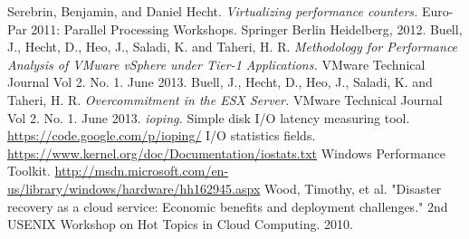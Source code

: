 \begin{thebibliography}{9}
Serebrin, Benjamin, and Daniel Hecht.  \emph{Virtualizing performance counters.}  Euro-Par 2011: Parallel Processing Workshops. Springer Berlin Heidelberg, 2012.
Buell, J., Hecht, D., Heo, J., Saladi, K. and Taheri, H. R.  \emph{Methodology for Performance Analysis of VMware vSphere under Tier-1 Applications.}  VMware Technical Journal Vol 2. No. 1.  June 2013.
Buell, J., Hecht, D., Heo, J., Saladi, K. and Taheri, H. R.  \emph{Overcommitment in the ESX Server.}  VMware Technical Journal Vol 2. No. 1.  June 2013.
\emph{ioping.}  Simple disk I/O latency measuring tool.  \url{https://code.google.com/p/ioping/}
 I/O statistics fields. \url{https://www.kernel.org/doc/Documentation/iostats.txt}
 Windows Performance Toolkit. \url{http://msdn.microsoft.com/en-us/library/windows/hardware/hh162945.aspx}
 Wood, Timothy, et al. "Disaster recovery as a cloud service: Economic benefits and deployment challenges." 2nd USENIX Workshop on Hot Topics in Cloud Computing. 2010.
\end{thebibliography}


